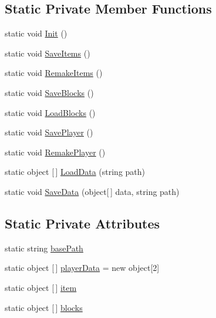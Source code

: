 \subsection*{Static Private Member Functions}
\begin{DoxyCompactItemize}
\item 
static void \hyperlink{class_bee_game_1_1_serialization_1_1_serialization_afefd28e9eab4d1ce6c61ed03b724902d}{Init} ()
\item 
static void \hyperlink{class_bee_game_1_1_serialization_1_1_serialization_a6eef4285def16ce7c5ce67b487e03dd1}{Save\+Items} ()
\item 
static void \hyperlink{class_bee_game_1_1_serialization_1_1_serialization_af06c3b4c0c2baa92fce21403e4fc5372}{Remake\+Items} ()
\item 
static void \hyperlink{class_bee_game_1_1_serialization_1_1_serialization_af90f749946423cc375c37bd7d496691a}{Save\+Blocks} ()
\item 
static void \hyperlink{class_bee_game_1_1_serialization_1_1_serialization_a3641370fc2ffea0db839cf7faf6c3efb}{Load\+Blocks} ()
\item 
static void \hyperlink{class_bee_game_1_1_serialization_1_1_serialization_a86c4e702114f2f6fdf2dd55517d8e691}{Save\+Player} ()
\item 
static void \hyperlink{class_bee_game_1_1_serialization_1_1_serialization_ac2d321fdd05f08085eefcb8f62c6baf0}{Remake\+Player} ()
\item 
static object \mbox{[}$\,$\mbox{]} \hyperlink{class_bee_game_1_1_serialization_1_1_serialization_a733a85a3fd7cb1194269464a71926959}{Load\+Data} (string path)
\item 
static void \hyperlink{class_bee_game_1_1_serialization_1_1_serialization_a5e84293340234b478d4ef6bd8168260f}{Save\+Data} (object\mbox{[}$\,$\mbox{]} data, string path)
\end{DoxyCompactItemize}
\subsection*{Static Private Attributes}
\begin{DoxyCompactItemize}
\item 
static string \hyperlink{class_bee_game_1_1_serialization_1_1_serialization_ab90922fcf58a723ce591487507356310}{base\+Path}
\item 
static object \mbox{[}$\,$\mbox{]} \hyperlink{class_bee_game_1_1_serialization_1_1_serialization_a4c53353a34466434389b58c351edf08d}{player\+Data} = new object\mbox{[}2\mbox{]}
\item 
static object \mbox{[}$\,$\mbox{]} \hyperlink{class_bee_game_1_1_serialization_1_1_serialization_af3359d6ca7e84c9e52a790beb1cc502e}{item}
\item 
static object \mbox{[}$\,$\mbox{]} \hyperlink{class_bee_game_1_1_serialization_1_1_serialization_a0b8dee0f221f22b34bb3de8c146b4d0d}{blocks}
\end{DoxyCompactItemize}


